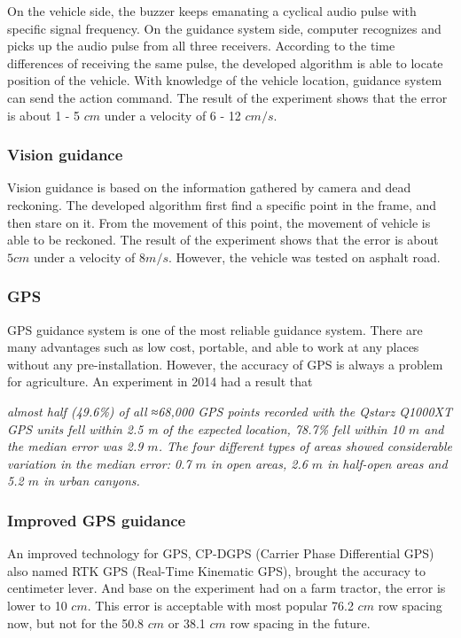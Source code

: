 \documentclass[12pt]{article}
\begin{document}
\begin{flushleft}
On the vehicle side, the buzzer keeps emanating a cyclical audio pulse with specific signal frequency. On the guidance system side, computer recognizes and picks up the audio pulse from all three receivers. According to the time differences of receiving the same pulse, the developed algorithm is able to locate position of the vehicle. With knowledge of the vehicle location, guidance system can send the action command. The result of the experiment shows that the error is about 1 - 5 $cm$ under a velocity of 6 - 12 $cm/s$.\cite{yuping2011sound}

\subsubsection{Vision guidance}
Vision guidance is based on the information gathered by camera and dead reckoning. The developed algorithm first find a specific point in the frame, and then stare on it. From the movement of this point, the movement of vehicle is able to be reckoned. The result of the experiment shows that the error is about $5 cm$ under a velocity of $8 m/s$. However, the vehicle was tested on asphalt road. \cite{jiang2006algorithm}

\subsubsection{GPS}
GPS guidance system is one of the most reliable guidance system. There are many advantages such as low cost, portable, and able to work at any places without any pre-installation. However, the accuracy of GPS is always a problem for agriculture. An experiment in 2014 had a result that 
\begin{adjustwidth}{0.5 in}{}
	\textit{almost half (49.6\%) of all ≈68,000 GPS points recorded with the Qstarz Q1000XT GPS units fell within 2.5 m of the expected location, 78.7\% fell within 10 $m$ and the median error was 2.9 $m$. The four different types of areas showed considerable variation in the median error: 0.7 $m$ in open areas, 2.6 $m$ in half-open areas and 5.2 $m$ in urban canyons.} \cite{schipperijn2014dynamic}
\end{adjustwidth}
 
\subsubsection{Improved GPS guidance}
An improved technology for GPS, CP-DGPS (Carrier Phase Differential GPS) also named RTK GPS (Real-Time Kinematic GPS), brought the accuracy to centimeter lever. And base on the experiment had on a farm tractor, the error is lower to 10 $cm$. \cite{thuilot2002automatic} This error is acceptable with most popular 76.2 $cm$ row spacing now, but not for the 50.8 $cm$ or 38.1 $cm$ row spacing in the future. \cite{fawcett2014farm} 


\end{flushleft}
\end{document}
